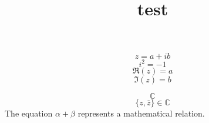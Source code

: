 \documentclass{article}
\title{test}
\begin{document}
\[ z=a+ib \]
\[ i^2=-1 \]
\[ \Re(z)=a \]
\[ \Im(z)=b \]

\[ \mathbb{C} \]
\[ \{z,\overline{z}\} \in \mathbb{C} \]
The equation \( \alpha + \beta\) represents a mathematical relation.
\end{document}
